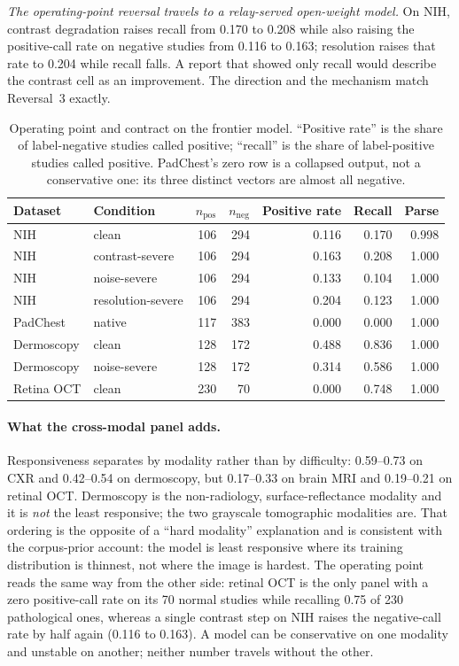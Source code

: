 \emph{The operating-point reversal travels to a relay-served open-weight model.} On NIH, contrast
degradation raises recall from 0.170 to 0.208 while also raising the positive-call
rate on negative studies from 0.116 to 0.163; resolution raises that rate to
0.204 while recall falls. A report that showed only recall would describe the
contrast cell as an improvement. The direction and the mechanism match
Reversal~3 exactly.

\begin{table}[t]
\centering
\small
\caption{Operating point and contract on the frontier model. ``Positive rate''
is the share of label-negative studies called positive; ``recall'' is the share of
label-positive studies called positive. PadChest's zero row is a collapsed output,
not a conservative one: its three distinct vectors are almost all negative.}
\label{tab:api-op}
\begin{tabular}{llrrrrr}
\toprule
Dataset & Condition & $n_{\text{pos}}$ & $n_{\text{neg}}$ & Positive rate & Recall & Parse \\
\midrule
NIH        & clean             & 106 & 294 & 0.116 & 0.170 & 0.998 \\
NIH        & contrast-severe   & 106 & 294 & 0.163 & 0.208 & 1.000 \\
NIH        & noise-severe      & 106 & 294 & 0.133 & 0.104 & 1.000 \\
NIH        & resolution-severe & 106 & 294 & 0.204 & 0.123 & 1.000 \\
PadChest   & native            & 117 & 383 & 0.000 & 0.000 & 1.000 \\
Dermoscopy & clean             & 128 & 172 & 0.488 & 0.836 & 1.000 \\
Dermoscopy & noise-severe      & 128 & 172 & 0.314 & 0.586 & 1.000 \\
Retina OCT & clean             & 230 &  70 & 0.000 & 0.748 & 1.000 \\
\bottomrule
\end{tabular}
\end{table}

\paragraph{What the cross-modal panel adds.} Responsiveness separates by modality
rather than by difficulty: 0.59--0.73 on CXR and 0.42--0.54 on dermoscopy, but
0.17--0.33 on brain MRI and 0.19--0.21 on retinal OCT. Dermoscopy is the
non-radiology, surface-reflectance modality and it is \emph{not} the least
responsive; the two grayscale tomographic modalities are. That ordering is the opposite of a ``hard modality'' explanation
and is consistent with the corpus-prior account: the model is least responsive
where its training distribution is thinnest, not where the image is hardest.
The operating point reads the same way from the other side: retinal OCT is the
only panel with a zero positive-call rate on its 70 normal studies while
recalling 0.75 of 230 pathological ones, whereas a single contrast step on NIH
raises the negative-call rate by half again (0.116 to 0.163). A model can be
conservative on one modality and unstable on another; neither number travels
without the other.

